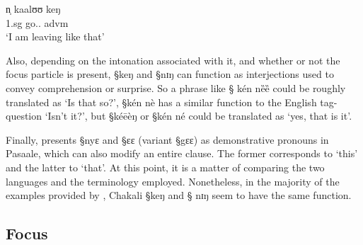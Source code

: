 \begin{exe}
 \ex\label{ex:GRM-keng-like} 
 \gll n̩ kaalʊʊ keŋ \\
 {\sc 1.sg} go.{\ipfv .\foc}  {\sc advm}\\
 \glt `I am leaving like that'
\end{exe}

Also, depending on the intonation associated with it, and whether or not  the
focus
particle  is  present, {\S keŋ} and {\S nɪŋ} can function as
interjections used to convey comprehension or surprise. So a phrase like {\S
kén nȅȅ} could be roughly translated as `Is that so?', {\S kén nè}   has a
similar function to the English  tag-question `Isn't it?', but {\S kéēèŋ} or
{\S kén né} could be translated as `yes, that is it'. 

Finally, \cite{Mcgi99} presents  {\S nyɛ} and {\S ɛɛ} (variant {\S gɛɛ}) as
demonstrative pronouns in Pasaale, which can also modify an entire clause. The
former
corresponds to `this' and the latter to `that'. At this point, it is a matter of
comparing the two languages and the terminology employed.  Nonetheless, in the
majority of the examples provided by \cite{Mcgi99}, Chakali {\S keŋ} and {\S
nɪŋ} seem to have the same function. 


\subsection{Focus}
\label{sc:GRM-focus}

